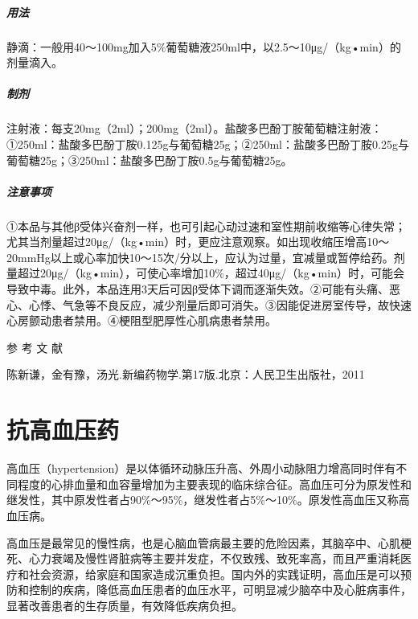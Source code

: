\paragraph{用法}

静滴：一般用40～100mg加入5\%葡萄糖液250ml中，以2.5～10μg/（kg•min）的剂量滴入。

\paragraph{制剂}

注射液：每支20mg（2ml）；200mg（2ml）。盐酸多巴酚丁胺葡萄糖注射液：①250ml：盐酸多巴酚丁胺0.125g与葡萄糖25g；②250ml：盐酸多巴酚丁胺0.25g与葡萄糖25g；③250ml：盐酸多巴酚丁胺0.5g与葡萄糖25g。

\paragraph{注意事项}

①本品与其他β受体兴奋剂一样，也可引起心动过速和室性期前收缩等心律失常；尤其当剂量超过20μg/（kg•min）时，更应注意观察。如出现收缩压增高10～20mmHg以上或心率加快10～15次/分以上，应认为过量，宜减量或暂停给药。剂量超过20μg/（kg•min），可使心率增加10\%，超过40μg/（kg•min）时，可能会导致中毒。此外，本品连用3天后可因β受体下调而逐渐失效。②可能有头痛、恶心、心悸、气急等不良反应，减少剂量后即可消失。③因能促进房室传导，故快速心房颤动患者禁用。④梗阻型肥厚性心肌病患者禁用。

\protect\hypertarget{text00408.html}{}{}

\hypertarget{text00408.htmlux5cux23CHP17-2-4}{}
参 考 文 献

陈新谦，金有豫，汤光.新编药物学.第17版.北京：人民卫生出版社，2011

\protect\hypertarget{text00409.html}{}{}

\chapter{抗高血压药}

高血压（hypertension）是以体循环动脉压升高、外周小动脉阻力增高同时伴有不同程度的心排血量和血容量增加为主要表现的临床综合征。高血压可分为原发性和继发性，其中原发性者占90\%～95\%，继发性者占5\%～10\%。原发性高血压又称高血压病。

高血压是最常见的慢性病，也是心脑血管病最主要的危险因素，其脑卒中、心肌梗死、心力衰竭及慢性肾脏病等主要并发症，不仅致残、致死率高，而且严重消耗医疗和社会资源，给家庭和国家造成沉重负担。国内外的实践证明，高血压是可以预防和控制的疾病，降低高血压患者的血压水平，可明显减少脑卒中及心脏病事件，显著改善患者的生存质量，有效降低疾病负担。


